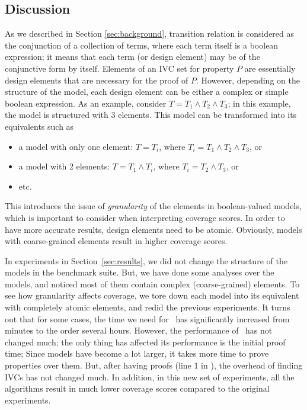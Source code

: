 \subsection{Discussion}
\label{sec:discussion}

As we described in Section \ref{sec:background}, transition relation is considered
as the conjunction of a collection of terms, where each term itself is a
boolean expression; it means that each term (or design element) may be of the conjunctive form by itself.
Elements of an IVC set for property $P$ are essentially design elements that are necessary for the proof of $P$. However, depending on the structure of the model, each design element can be either a complex or simple boolean expression.
As an example, consider $T = T_1 \wedge T_2 \wedge T_3$; in this example, the model is structured with 3 elements. This model can be transformed into its equivalents such as
\begin{itemize}
  \item a model with only one element: $T = T_i$, where $T_i = T_1 \wedge T_2 \wedge T_3$, or
  \item a model with 2 elements: $T = T_1 \wedge T_i$, where $T_i = T_2 \wedge T_3$, or
  \item etc.
\end{itemize}
This introduces the issue of \emph{granularity} of the elements in boolean-valued models, which is important to consider when interpreting coverage scores.
In order to have more accurate results, design elements need to be atomic.
Obviously, models with coarse-grained elements result in higher coverage scores.

In experiments in Section~\ref{sec:results}, we did not change the structure of the models in the benchmark suite.
But, we have done some analyses over the models, and noticed most of
them contain complex (coarse-grained) elements.
To see how granularity affects coverage, we tore down each model into its equivalent
with completely atomic elements, and redid the previous experiments.
It turns out that for some cases, the time we need for \nondetcov\ has significantly increased from minutes to the order several hours. However, the performance of \ivccov\ has not changed much; the only thing
has affected its performance is the initial proof time;
Since models have become a lot larger, it takes more time to prove properties over them.
But, after having proofs (line 1 in \ucalg), the overhead of finding IVCs has not changed much. In addition, in this new set of experiments, all the algorithms result in much lower coverage scores compared to the original experiments. 